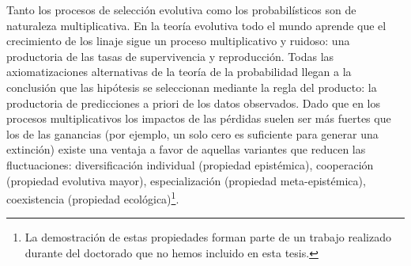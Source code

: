 \documentclass[a4paper,10pt]{book}
\theoremstyle{definition}
\begin{document}
Tanto los procesos de selecci\'on evolutiva como los probabil\'isticos son de naturaleza multiplicativa.
%
En la teor\'ia evolutiva todo el mundo aprende que el crecimiento de los linaje sigue un proceso multiplicativo y ruidoso: una productoria de las tasas de supervivencia y reproducci\'on.
%
Todas las axiomatizaciones alternativas de la teor\'ia de la probabilidad llegan a la conclusi\'on que las hip\'otesis se seleccionan mediante la regla del producto: la productoria de predicciones a priori de los datos observados.
%
Dado que en los procesos multiplicativos los impactos de las pérdidas suelen ser más fuertes que los de las ganancias (por ejemplo, un solo cero es suficiente para generar una extinci\'on) existe una ventaja a favor de aquellas variantes que reducen las fluctuaciones: diversificaci\'on individual (propiedad epistémica), cooperaci\'on (propiedad evolutiva mayor), especializaci\'on (propiedad meta-epistémica), coexistencia (propiedad ecol\'ogica)\footnote{La demostraci\'on de estas propiedades forman parte de un trabajo realizado durante del doctorado que no hemos incluido en esta tesis. }.

\end{document}
